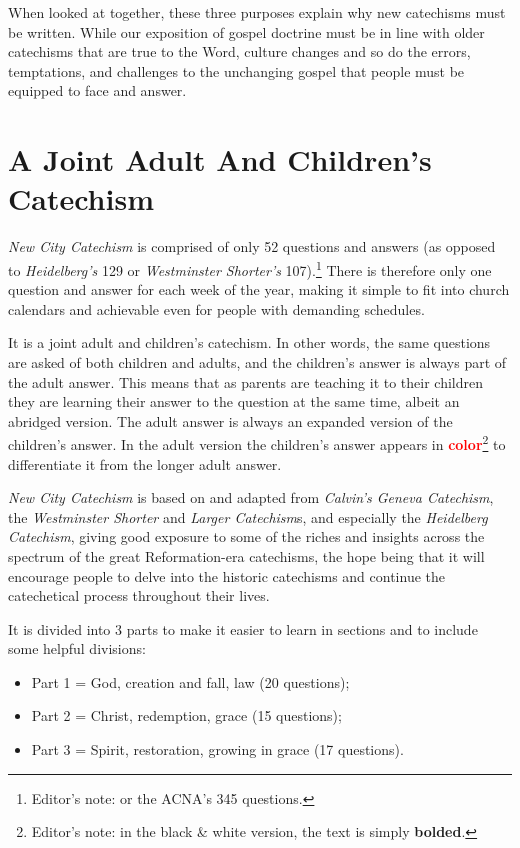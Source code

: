 \documentclass[titlepage]{memoir}
\newcommand\Children[1]{\textbf{\textcolor{red}{#1}}}
\begin{document}
When looked at together, these three purposes explain why new catechisms must be written. While our exposition of gospel doctrine must be in line with older catechisms that are true to the Word, culture changes and so do the errors, temptations, and challenges to the unchanging gospel that people must be equipped to face and answer.

\section{A Joint Adult And Children's Catechism}
\emph{New City Catechism}\/ is comprised of only 52 questions and answers (as opposed to \emph{Heidelberg's}\/ 129 or \emph{Westminster Shorter's}\/ 107).\footnote{Editor's note: or the ACNA's 345 questions.} There is therefore only one question and answer for each week of the year, making it simple to fit into church calendars and achievable even for people with demanding schedules.

It is a joint adult and children's catechism. In other words, the same questions are asked of both children and adults, and the children's answer is always part of the adult answer. This means that as parents are teaching it to their children they are learning their answer to the question at the same time, albeit an abridged version. The adult answer is always an expanded version of the children's answer. In the adult version the children's answer appears in \Children{color}\footnote{Editor's note: in the black \& white version, the text is simply \textbf{bolded}.} to differentiate it from the longer adult answer.

\emph{New City Catechism}\/ is based on and adapted from \emph{Calvin's Geneva Catechism}, the \emph{Westminster Shorter}\/ and \emph{Larger Catechism}s, and especially the \emph{Heidelberg Catechism}, giving good exposure to some of the riches and insights across the spectrum of the great Reformation-era catechisms, the hope being that it will encourage people to delve into the historic catechisms and continue the catechetical process throughout their lives.

It is divided into 3 parts to make it easier to learn in sections and to include some helpful divisions:
\begin{itemize}
	\item Part 1 = God, creation and fall, law (20 questions);
	\item Part 2 = Christ, redemption, grace (15 questions);
	\item Part 3 = Spirit, restoration, growing in grace (17 questions).
\end{itemize}
\end{document}
